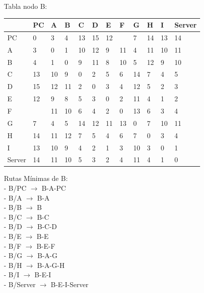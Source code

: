 \documentclass[a4paper]{article}
\begin{document}
\clearpage



\begin{table}[ht]
Tabla nodo B:\\
\begin{tabular}{|l|l|l|l|l|l|l|l|l|l|l|l|}
\hline
       & PC & A  & B & C & D & E & F & G & H & I  & Server \\ \hline
PC     & 0  & 3  & 4 & 13& 15& 12&   & 7 & 14& 13 & 14     \\ \hline
A      & 3  & 0  & 1 & 10& 12& 9 & 11& 4 & 11& 10 & 11     \\ \hline
B      & 4  & 1  & 0 & 9 & 11& 8 & 10& 5 & 12& 9  & 10     \\ \hline
C      & 13 & 10 & 9 & 0 & 2 & 5 & 6 & 14& 7 & 4  & 5      \\ \hline
D      & 15 & 12 & 11& 2 & 0 & 3 & 4 & 12& 5 & 2  & 3      \\ \hline
E      & 12 & 9  & 8 & 5 & 3 & 0 & 2 & 11& 4 & 1  & 2      \\ \hline
F      &    & 11 & 10& 6 & 4 & 2 & 0 & 13& 6 & 3  & 4      \\ \hline
G      & 7  & 4  & 5 & 14& 12& 11& 13& 0 & 7 & 10 & 11     \\ \hline
H      & 14 & 11 & 12& 7 & 5 & 4 & 6 & 7 & 0 & 3  & 4      \\ \hline
I      & 13 & 10 & 9 & 4 & 2 & 1 & 3 & 10& 3 & 0  & 1      \\ \hline
Server & 14 & 11 & 10& 5 & 3 & 2 & 4 & 11& 4 & 1  & 0      \\ \hline
\end{tabular}

Rutas Mínimas de B:\\
-	B/PC  $\rightarrow$  B-A-PC\\
-	B/A  $\rightarrow$  B-A\\
-	B/B  $\rightarrow$  B\\
-	B/C  $\rightarrow$  B-C\\
-	B/D  $\rightarrow$  B-C-D\\
-	B/E  $\rightarrow$  B-E\\
-	B/F  $\rightarrow$  B-E-F\\
-	B/G  $\rightarrow$  B-A-G\\
-	B/H  $\rightarrow$  B-A-G-H\\
-	B/I  $\rightarrow$  B-E-I\\
-	B/Server  $\rightarrow$  B-E-I-Server\\
\end{table}
\end{document}
